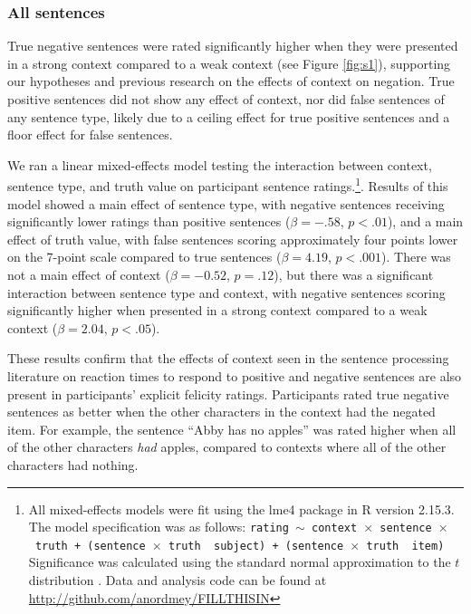 \documentclass[10pt,letterpaper]{article}
\begin{document}
\subsubsection{All sentences}

True negative sentences were rated significantly higher when they were presented in a strong context compared to a weak context (see Figure \ref{fig:s1}), supporting our hypotheses and previous research on the effects of context on negation.  True positive sentences did not show any effect of context, nor did false sentences of any sentence type, likely due to a ceiling effect for true positive sentences and a floor effect for false sentences.  

We ran a linear mixed-effects model testing the interaction between context, sentence type, and truth value on participant sentence ratings.\footnote{All mixed-effects models were fit using the lme4 package in R version 2.15.3.  The model specification was as follows: \texttt{rating $\sim$ context~$\times$~sentence~$\times$~truth + (sentence~$\times$~truth~\textbar~subject) +  (sentence~$\times$~truth~\textbar~item)}  Significance was calculated using the standard normal approximation to the $t$ distribution \cite{barr2013}. Data and analysis code can be found at \href{http://github.com/anordmey/FILLTHISIN}{http://github.com/anordmey/FILLTHISIN}}.  Results of this model showed a main effect of sentence type, with negative sentences receiving significantly lower ratings than positive sentences ($\beta= -.58$, $p< .01$), and a main effect of truth value, with false sentences scoring approximately four points lower on the 7-point scale compared to true sentences ($\beta= 4.19$, $p< .001$).  There was not a main effect of context ($\beta= -0.52$, $p=.12$), but there was a significant interaction between sentence type and context, with negative sentences scoring significantly higher when presented in a strong context compared to a weak context ($\beta= 2.04$, $p< .05$).  

These results confirm that the effects of context seen in the sentence processing literature on reaction times to respond to positive and negative sentences are also present in participants' explicit felicity ratings.  Participants rated true negative sentences as better when the other characters in the context had the negated item.  For example, the sentence ``Abby has no apples'' was rated higher when all of the other characters \emph{had} apples, compared to contexts where all of the other characters had nothing.  
\end{document}
